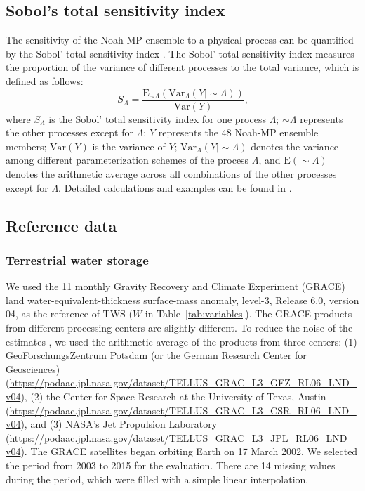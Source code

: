 \documentclass[essd, manuscript]{copernicus}
\begin{document}
\subsection{Sobol's total sensitivity index}\label{sec:methods:sobol}

The sensitivity of the Noah-MP ensemble to a physical process can be quantified by the Sobol' total sensitivity index \citep{sobol1993MMCE, zheng2019WRR}. The Sobol' total sensitivity index measures the proportion of the variance of different processes to the total variance, which is defined as follows:
\begin{equation}
  S_{\Lambda} = \frac{\mathrm{E}_{\sim\Lambda}(\mathrm{Var}_{\Lambda}(Y|\sim\Lambda))}{\mathrm{Var}(Y)}
  \text{,}
\end{equation}
where \(S_{\Lambda}\) is the Sobol' total sensitivity index for one process \(\Lambda\); \(\sim\Lambda\) represents the other processes except for \(\Lambda\); \(Y\) represents the 48 Noah-MP ensemble members; \(\mathrm{Var}(Y)\) is the variance of \(Y\); \(\mathrm{Var}_{\Lambda}(Y|\sim\Lambda)\) denotes the variance among different parameterization schemes of the process \(\Lambda\), and \(\mathrm{E}(\sim\Lambda)\) denotes the arithmetic average across all combinations of the other processes except for \(\Lambda\). Detailed calculations and examples can be found in \citet[Appendix A]{zheng2019WRR}.

\subsection{Reference data}\label{sec:methods:ref}

\subsubsection{Terrestrial water storage}\label{sec:methods:ref:tws}

We used the 1\degree{}\times{}1\degree{} monthly Gravity Recovery and Climate Experiment (GRACE) land water-equivalent-thickness surface-mass anomaly, level-3, Release 6.0, version 04, as the reference of TWS (\(W\) in Table~\ref{tab:variables}). The GRACE products from different processing centers are slightly different. To reduce the noise of the estimates \citep{sakumura2014GRL}, we used the arithmetic average of the products from three centers: (1) GeoForschungsZentrum Potsdam (or the German Research Center for Geosciences) (\url{https://podaac.jpl.nasa.gov/dataset/TELLUS_GRAC_L3_GFZ_RL06_LND_v04}), (2) the Center for Space Research at the University of Texas, Austin (\url{https://podaac.jpl.nasa.gov/dataset/TELLUS_GRAC_L3_CSR_RL06_LND_v04}), and (3) NASA's Jet Propulsion Laboratory (\url{https://podaac.jpl.nasa.gov/dataset/TELLUS_GRAC_L3_JPL_RL06_LND_v04}). The GRACE satellites began orbiting Earth on 17 March 2002. We selected the period from 2003 to 2015 for the evaluation. There are 14 missing values during the period, which were filled with a simple linear interpolation.
\end{document}
